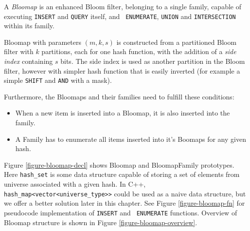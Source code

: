 A {\it Bloomap} is an enhanced Bloom filter, belonging to a single
family, capable of executing {\tt INSERT} and {\tt QUERY} itself, and {\tt
ENUMERATE}, {\tt UNION} and {\tt INTERSECTION} within its family.

Bloomap with parameters $(m, k, s)$ is constructed from a partitioned Bloom
filter with $k$ partitions, each for one hash function, with the addition of a
{\it side index} containing $s$ bits. The side index is used as another
partition in the Bloom filter, however with simpler hash function that is easily
inverted (for example a simple {\tt SHIFT} and {\tt AND} with a mask).

Furthermore, the Bloomaps and their families need to fulfill these conditions:

\begin{itemize}
	\item When a new item is inserted into a Bloomap, it is also inserted into
		the family.
	\item A Family has to enumerate all items inserted into it's Boomaps for any
		given hash.
\end{itemize}


Figure \ref{figure-bloomap-decl} shows Bloomap and BloomapFamily prototypes.
Here {\tt hash\_set} is some data structure capable of storing a set of
elements from universe associated with a given hash. In C++, {\tt
hash\_map<vector<universe\_type>>} could be used as a naive data structure, but
we offer a better solution later in this chapter. See Figure
\ref{figure-bloomap-fn} for pseudocode implementation of {\tt INSERT} and {\tt
ENUMERATE} functions. Overview of Bloomap structure is shown in Figure
\ref{figure-bloomap-overview}.

